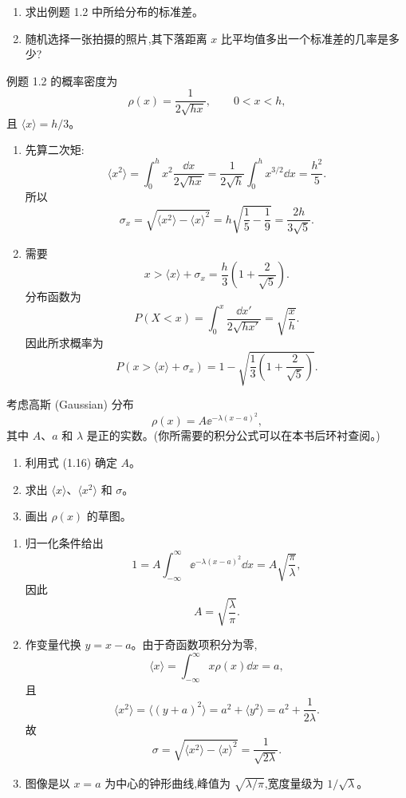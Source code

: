 \begin{question}
\begin{enumerate}
\item 求出例题 1.2 中所给分布的标准差。
\item 随机选择一张拍摄的照片,其下落距离 $x$ 比平均值多出一个标准差的几率是多少?
\end{enumerate}
\begin{solution}
例题 1.2 的概率密度为
\[
\rho(x)=\frac{1}{2\sqrt{hx}},\qquad 0<x<h,
\]
且 $\langle x\rangle=h/3$。
\begin{enumerate}
\item 先算二次矩:
\[
\langle x^2\rangle=\int_0^h x^2\frac{\dd x}{2\sqrt{hx}}
=\frac{1}{2\sqrt h}\int_0^h x^{3/2}\dd x
=\frac{h^2}{5}.
\]
所以
\[
\sigma_x=\sqrt{\langle x^2\rangle-\langle x\rangle^2}
=h\sqrt{\frac15-\frac19}=\frac{2h}{3\sqrt5}.
\]
\item 需要
\[
x>\langle x\rangle+\sigma_x=\frac{h}{3}\left(1+\frac{2}{\sqrt5}\right).
\]
分布函数为
\[
P(X<x)=\int_0^x \frac{\dd x'}{2\sqrt{hx'}}=\sqrt{\frac{x}{h}}.
\]
因此所求概率为
\[
P\left(x>\langle x\rangle+\sigma_x\right)
=1-\sqrt{\frac13\left(1+\frac{2}{\sqrt5}\right)}.
\]
\end{enumerate}
\end{solution}
\end{question}

\begin{question}
考虑高斯 (Gaussian) 分布
\[
\rho(x)=A \ee^{-\lambda (x-a)^2},
\]
其中 $A$、$a$ 和 $\lambda$ 是正的实数。(你所需要的积分公式可以在本书后环衬查阅。)
\begin{enumerate}
\item 利用式 (1.16) 确定 $A$。
\item 求出 $\langle x\rangle$、$\langle x^2\rangle$ 和 $\sigma$。
\item 画出 $\rho(x)$ 的草图。
\end{enumerate}

\par\smallskip
{}

\begin{solution}
\begin{enumerate}
\item 归一化条件给出
\[
1=A\int_{-\infty}^{\infty}\ee^{-\lambda(x-a)^2}\dd x
=A\sqrt{\frac{\pi}{\lambda}},
\]
因此
\[
A=\sqrt{\frac{\lambda}{\pi}}.
\]
\item 作变量代换 $y=x-a$。由于奇函数项积分为零,
\[
\langle x\rangle=\int_{-\infty}^{\infty}x\rho(x)\dd x=a,
\]
且
\[
\langle x^2\rangle=\langle (y+a)^2\rangle
=a^2+\langle y^2\rangle
=a^2+\frac{1}{2\lambda}.
\]
故
\[
\sigma=\sqrt{\langle x^2\rangle-\langle x\rangle^2}=\frac{1}{\sqrt{2\lambda}}.
\]
\item 图像是以 $x=a$ 为中心的钟形曲线,峰值为 $\sqrt{\lambda/\pi}$,宽度量级为 $1/\sqrt{\lambda}$。
\end{enumerate}
\end{solution}
\end{question}

